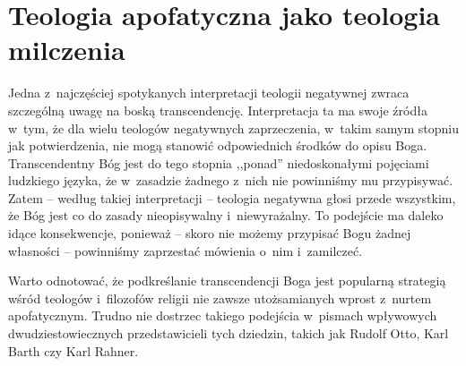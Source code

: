 

\chapter{Teologia apofatyczna jako teologia milczenia}\label{sil-general}




Jedna z~najczęściej spotykanych interpretacji teologii negatywnej zwraca szczególną uwagę na boską transcendencję. Interpretacja ta ma swoje źródła w~tym, że dla wielu teologów negatywnych zaprzeczenia, w~takim samym stopniu jak potwierdzenia, nie mogą stanowić odpowiednich środków do opisu Boga. Transcendentny Bóg jest do tego stopnia ,,ponad'' niedoskonałymi pojęciami ludzkiego języka, że w~zasadzie żadnego z~nich nie powinniśmy mu przypisywać. Zatem -- według takiej interpretacji -- teologia negatywna głosi przede wszystkim, że Bóg jest co do zasady nieopisywalny i~niewyrażalny. To podejście ma daleko idące konsekwencje, ponieważ -- skoro nie możemy przypisać Bogu żadnej własności -- powinniśmy zaprzestać mówienia o~nim i~zamilczeć.


Warto odnotować, że podkreślanie transcendencji Boga jest popularną strategią wśród teologów i~filozofów religii nie zawsze utożsamianych wprost z~nurtem apofatycznym. Trudno nie dostrzec takiego podejścia w~pismach wpływowych dwudziestowiecznych przedstawicieli tych dziedzin, takich jak Rudolf Otto, Karl Barth czy Karl Rahner.

